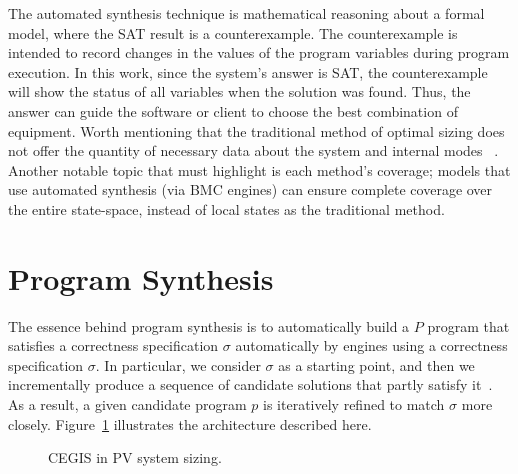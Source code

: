 \documentclass[review]{elsarticle}
\begin{document}
The automated synthesis technique is mathematical reasoning about a formal model, where the SAT result is a counterexample. The counterexample is intended to record changes in the values of the program variables during program execution. In this work, since the system's answer is SAT, the counterexample will show the status of all variables when the solution was found. Thus, the answer can guide the software or client to choose the best combination of equipment. Worth mentioning that the traditional method of optimal sizing does not offer the quantity of necessary data about the system and internal modes ~\citep{Benatiallah2017,Pradhan,Swarnkar}. Another notable topic that must highlight is each method's coverage; models that use automated synthesis (via BMC engines) can ensure complete coverage over the entire state-space, instead of local states as the traditional method.

\section{Program Synthesis}
\label{sec:Synthesis}

The essence behind program synthesis is to automatically build a $P$ program that satisfies a correctness specification $\sigma$ automatically by engines using a correctness specification $\sigma$. In particular, we consider $\sigma$ as a starting point, and then we incrementally produce a sequence of candidate solutions that partly satisfy it~\citep{Abateetal2017}. As a result, a given candidate program $p$ is iteratively refined to match $\sigma$ more closely. Figure~\ref{Counter-Example-Guided-Inductive-Synthesis} illustrates the architecture described here.

%
\begin{figure}[ht]
\begin{center}
\end{center}
	\caption{CEGIS in PV system sizing.}
	\label{Counter-Example-Guided-Inductive-Synthesis}
\end{figure}
\end{document}

